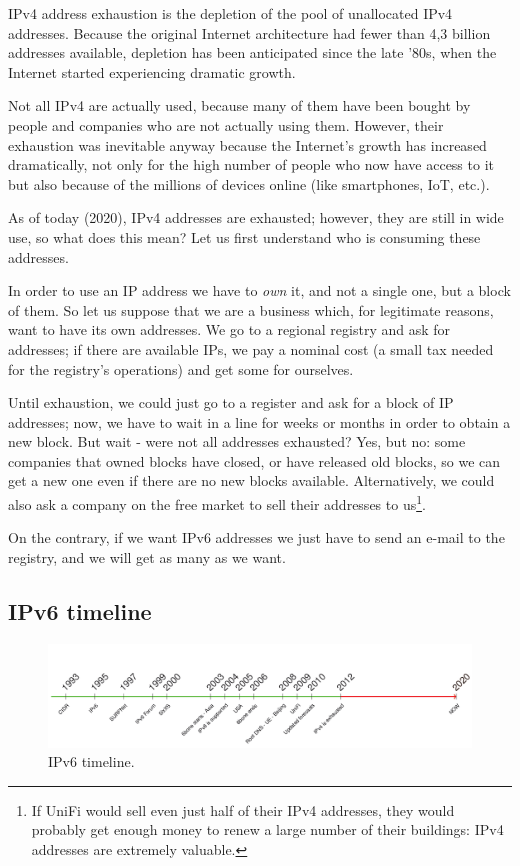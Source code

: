 IPv4 address exhaustion is the depletion of the pool of unallocated IPv4 addresses. Because the original Internet architecture had fewer than 4,3 billion addresses available, depletion has been anticipated since the late '80s, when the Internet started experiencing dramatic growth.

Not all IPv4 are actually used, because many of them have been bought by people and companies who are not actually using them. However, their exhaustion was inevitable anyway because the Internet's growth has increased dramatically, not only for the high number of people who now have access to it but also because of the millions of devices online (like smartphones, IoT, etc.).

As of today (2020), IPv4 addresses are exhausted; however, they are still in wide use, so what does this mean?
Let us first understand who is consuming these addresses.

In order to use an IP address we have to \textit{own} it, and not a single one, but a block of them. So let us suppose that we are a business which, for legitimate reasons, want to have its own addresses. We go to a regional registry and ask for addresses; if there are available IPs, we pay a nominal cost (a small tax needed for the registry's operations) and get some for ourselves.

Until exhaustion, we could just go to a register and ask for a block of IP addresses; now, we have to wait in a line for weeks or months in order to obtain a new block. But wait - were not all addresses exhausted? Yes, but no: some companies that owned blocks have closed, or have released old blocks, so we can get a new one even if there are no new blocks available. Alternatively, we could also ask a company on the free market to sell their addresses to us\footnote{If UniFi would sell even just half of their IPv4 addresses, they would probably get enough money to renew a large number of their buildings: IPv4 addresses are extremely valuable.}.

On the contrary, if we want IPv6 addresses we just have to send an e-mail to the registry, and we will get as many as we want.


\subsection{IPv6 timeline}

\begin{figure}[H]
    \centering
    \includegraphics[scale=0.48]{img/ipv6timeline.png}
    \decoRule
    \caption{IPv6 timeline.}
    \label{fig:ipv6timeline}
\end{figure}

